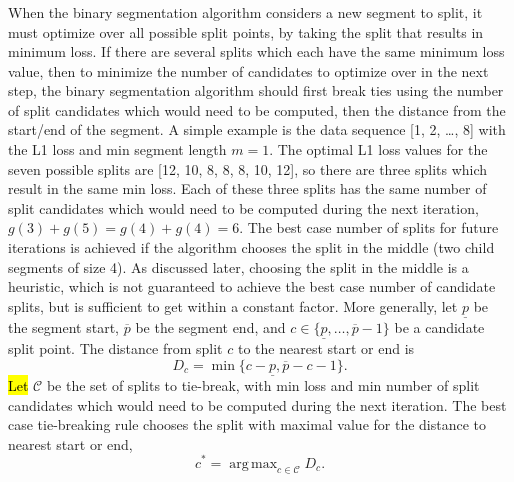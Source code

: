 \documentclass[algorithms,article,accept,oneauthor]{Definitions/mdpi}
\DeclareMathOperator*{\argmax}{arg\, max}
\begin{document}
\subsubsection{} %
 
When the binary segmentation algorithm considers a new segment to split, it must optimize over all possible split points, by taking the split that results in minimum loss. 
If there are several splits which each have the same minimum loss value, then to minimize the number of candidates to optimize over in the next step, the binary segmentation algorithm should first break ties using the number of split candidates which would need to be computed, then the distance from the start/end of the segment. 
A simple example is the data sequence [1, 2, \ldots, 8] with the L1 loss and min segment length $m=1$.
The optimal L1 loss values for the seven possible splits are [12, 10, 8, 8, 8, 10, 12], so there are three splits which result in the same min loss.
Each of these three splits has the same number of split candidates which would need to be computed during the next iteration, $g(3)+g(5)=g(4)+g(4)=6$.
The best case number of splits for future iterations is achieved if the algorithm chooses the split in the middle (two child segments of size 4).
{As discussed later, choosing the split in the middle is a heuristic, which is not guaranteed to achieve the best case number of candidate splits, but is sufficient to get within a constant factor.} More generally, let $\underline p$ be the segment start, $\overline p$ be the segment end, and $c\in\{\underline p, \dots, \overline p-1\}$ be a candidate split point.
The distance from split $c$ to the nearest start or end is
\begin{equation}
    D_c = \min\{ c-\underline p, \overline p-c-1 \}.
\end{equation}
\hl{Let} %
 $\mathcal C$ be the set of splits to tie-break, with min loss and min number of split candidates which would need to be computed during the next iteration.
The best case tie-breaking rule chooses the split with maximal value for the distance to nearest start or end,
\vspace{12pt}
\begin{equation}
    c^* = \argmax_{c\in\mathcal C} D_c.
\end{equation}
\end{document}
